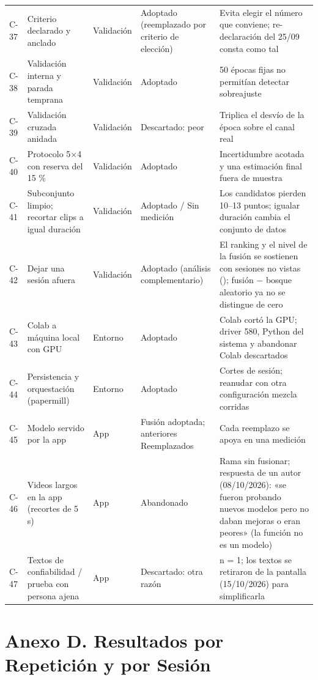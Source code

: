 \begin{longtable}{@{}p{}p{}p{}p{}p{}@{}}
C-37 & Criterio declarado y anclado & Validación & Adoptado (reemplazado por criterio de elección) & Evita elegir el número que conviene; re-declaración del 25/09 consta como tal \\
C-38 & Validación interna y parada temprana & Validación & Adoptado & 50 épocas fijas no permitían detectar sobreajuste \\
C-39 & Validación cruzada anidada & Validación & Descartado: peor & Triplica el desvío de la época sobre el canal real \\
C-40 & Protocolo 5\ensuremath{\times}4 con reserva del 15 \% & Validación & Adoptado & Incertidumbre acotada y una estimación final fuera de muestra \\
C-41 & Subconjunto limpio; recortar clips a igual duración & Validación & Adoptado / Sin medición & Los candidatos pierden 10–13 puntos; igualar duración cambia el conjunto de datos \\
C-42 & Dejar una sesión afuera & Validación & Adoptado (análisis complementario) & El ranking y el nivel de la fusión se sostienen con sesiones no vistas (\FusionSesionF{}); fusión \ensuremath{-} bosque aleatorio ya no se distingue de cero \\
C-43 & Colab a máquina local con GPU & Entorno & Adoptado & Colab cortó la GPU; driver 580, Python del sistema y abandonar Colab descartados \\
C-44 & Persistencia y orquestación (papermill) & Entorno & Adoptado & Cortes de sesión; reanudar con otra configuración mezcla corridas \\
C-45 & Modelo servido por la app & App & Fusión adoptada; anteriores Reemplazados & Cada reemplazo se apoya en una medición \\
C-46 & Videos largos en la app (recortes de 5 s) & App & Abandonado & Rama sin fusionar; respuesta de un autor (08/10/2026): «se fueron probando nuevos modelos pero no daban mejoras o eran peores» (la función no es un modelo) \\
C-47 & Textos de confiabilidad / prueba con persona ajena & App & Descartado: otra razón & n = 1; los textos se retiraron de la pantalla (15/10/2026) para simplificarla \\
\end{longtable}
\endgroup

\section{Anexo D. Resultados por Repetición y por Sesión}
